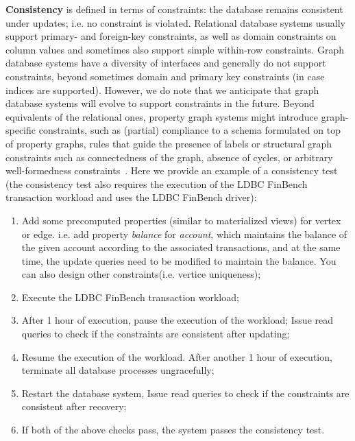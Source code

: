 {\bf Consistency} is defined in terms of constraints: the database remains
consistent under updates; i.e. no constraint is violated. Relational database
systems usually support primary- and foreign-key constraints, as well as domain
constraints on column values and sometimes also support simple within-row
constraints. Graph database systems have a diversity of interfaces and generally
do not support constraints, beyond sometimes domain and primary key constraints
(in case indices are supported). However, we do note that we anticipate that
graph database systems will evolve to support constraints in the future. Beyond
equivalents of the relational ones, property graph systems might introduce
graph-specific constraints, such as (partial) compliance to a schema formulated
on top of property graphs, rules that guide the presence of labels or structural
graph constraints such as connectedness of the graph, absence of cycles, or
arbitrary well-formedness constraints~\cite{DBLP:journals/sosym/SemerathBHSV17}.
Here we provide an example of a consistency test (the consistency test also
requires the execution of the LDBC FinBench transaction workload and uses the
LDBC FinBench driver):

\begin{enumerate}[label={(\roman*)}]
  \item Add some precomputed properties (similar to materialized views) for vertex
        or edge. i.e. add property \emph{balance} for \emph{account}, which
        maintains the balance of the given account according to the associated
        transactions, and at the same time, the update queries need to be modified
        to maintain the balance. You can also design other constraints(i.e. vertice
        uniqueness);
  \item Execute the LDBC FinBench transaction workload;
  \item After 1 hour of execution, pause the execution of the workload;
        Issue read queries to check if the constraints are consistent after
        updating;
  \item Resume the execution of the workload. After another 1 hour of execution,
        terminate all database processes ungracefully;
  \item Restart the database system, Issue read queries to check if the
        constraints are consistent after recovery;
  \item If both of the above checks pass, the system passes the
        consistency test.
\end{enumerate}
